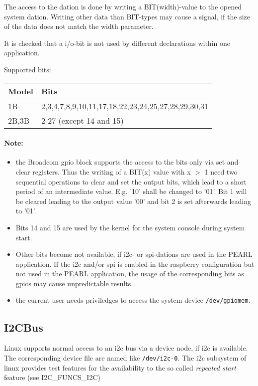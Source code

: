 The access to the dation is done by writing a BIT(width)-value to the
opened system dation. 
Writing other data than BIT-types  may cause a signal, if the size of the
data does not match the width parameter. 

It is checked that a i/o-bit is not used by different declarations within
one application.

Supported bits:

\begin{tabular}{|l|l|}
\hline
Model & Bits \\
\hline
1B & 2,3,4,7,8,9,10,11,17,18,22,23,24,25,27,28,29,30,31 \\
\hline
2B,3B & 2-27 (except 14 and 15) \\
\hline
\end{tabular}  

\paragraph{Note:} 
\begin{itemize}
\item the Broadcom gpio block supports the access to the bits only 
via set and clear registers. Thus the writing of a BIT(x) value with x $>$ 1
need two sequential operations to clear and set the output bits, which lead
to a short period of an intermediate value. E.g. '10' shall be changed to '01'. Bit 1 will be cleared leading to the output value '00' and bit 2 
is set afterwards leading to '01'.

\item Bits 14 and 15 are used by the kernel for the 
  system console during system start.
\item Other bits become not available, if i2c- or spi-dations are used
  in the PEARL application.  If the i2c and/or spi is enabled in the
  raspberry configuration but not used in the PEARL application,
  the usage of the corresponding bits 
  as gpios may cause unpredictable results.
\item the current user needs priviledges to access the system device 
  \verb|/dev/gpiomem|.
\end{itemize}
 
\subsection{I2CBus}
Linux supports normal access to an i2c bus via a device node,
 if i2c is available. 
The corresponding device file are named like \texttt{/dev/i2c-0}.
The i2c subsystem of linux provides test features for the availability
to the so called {\em repeated start} feature (see I2C\_FUNCS\_I2C)

